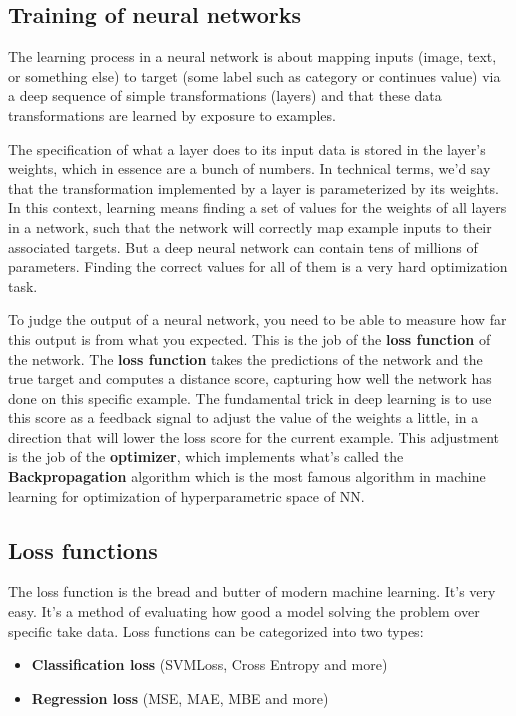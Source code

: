 \documentclass[thesis=M,english]{FITthesis}[2012/10/20]
\begin{document}
\subsection{Training of neural networks}
The learning process in a neural network is about mapping inputs (image, text, or something else) to target (some label such as category or continues value) via a deep sequence of simple transformations (layers) and that these data transformations are learned by exposure to examples. 

The specification of what a layer does to its input data is stored in the layer's weights, which in essence are a bunch of numbers. In technical terms, we'd say that the transformation implemented by a layer is parameterized by its weights. In this context, learning means finding a set of values for the weights of all layers in a network, such that the network will correctly map example inputs to their associated targets. But a deep neural network can contain tens of millions of parameters. Finding the correct values for all of them is a very hard optimization task. 

To judge the output of a neural network, you need to be able to measure how far this output is from what you expected. This is the job of the \textbf{loss function} of the network. The \textbf{loss function} takes the predictions of the network and the true target and computes a distance score, capturing how well the network has done on this specific example. The fundamental trick in deep learning is to use this score as a feedback signal to adjust the value of the weights a little, in a direction that will lower the loss score for the current example. This adjustment is the job of the \textbf{optimizer}, which implements what's called the \textbf{Backpropagation} algorithm which is the most famous algorithm in machine learning for optimization of hyperparametric space of NN. \nocite{DLwP}

\subsection{Loss functions}
The loss function is the bread and butter of modern machine learning. It's very easy. It's a method of evaluating how good a model solving the problem over specific take data. Loss functions can be categorized into two types:
\begin{itemize}
  \item \textbf{Classification loss} (SVMLoss, Cross Entropy and more) 
  \item \textbf{Regression loss} (MSE, MAE, MBE and more)
\end{itemize}
\end{document}
